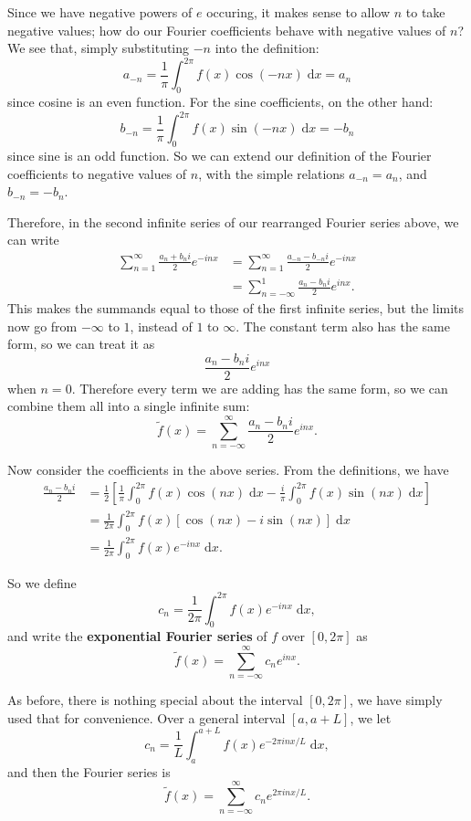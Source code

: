 \documentclass{article}
\newcommand{\diff}{\;\mathrm{d}}
\begin{document}
Since we have negative powers of $e$ occuring, it makes sense to allow $n$ to take negative values; how do our Fourier coefficients behave with negative values of $n$? We see that, simply substituting $-n$ into the definition:
\[a_{-n} = \frac{1}{\pi}\int_0^{2\pi} f(x)\cos\left(-nx\right)\diff x=a_n\]
since cosine is an even function. For the sine coefficients, on the other hand:
\[b_{-n} = \frac{1}{\pi}\int_0^{2\pi} f(x)\sin\left(-nx\right)\diff x=-b_n\]
since sine is an odd function. So we can extend our definition of the Fourier coefficients to negative values of $n$, with the simple relations $a_{-n}=a_n$, and $b_{-n}=-b_n$.

Therefore, in the second infinite series of our rearranged Fourier series above, we can write
\begin{align*}
	\sum_{n=1}^\infty \frac{a_n+b_ni}{2}e^{-inx}&=\sum_{n=1}^\infty \frac{a_{-n}-b_{-n}i}{2}e^{-inx}\\
	&= \sum_{n=-\infty}^1 \frac{a_n-b_ni}{2}e^{inx}.
\end{align*}
This makes the summands equal to those of the first infinite series, but the limits now go from $-\infty$ to $1$, instead of $1$ to $\infty$. The constant term also has the same form, so we can treat it as
\[\frac{a_n-b_ni}{2}e^{inx}\]
when $n=0$. Therefore every term we are adding has the same form, so we can combine them all into a single infinite sum:
\[\tilde{f}(x)=\sum_{n=-\infty}^\infty \frac{a_n-b_ni}{2}e^{inx}.\]\medskip


Now consider the coefficients in the above series. From the definitions, we have
\begin{align*}
	\frac{a_n-b_ni}{2} &= \frac{1}{2}\left[\frac{1}{\pi}\int_0^{2\pi}\!\!f(x)\cos\left(nx\right)\diff x -\frac{i}{\pi}\int_0^{2\pi}\!\! f(x)\sin\left(nx\right)\diff x\right]\\
	&=\frac{1}{2\pi}\int_0^{2\pi}\!\!f(x)\left[\cos\left(nx\right) - i \sin\left(nx\right)\right]\diff x\\
	&=\frac{1}{2\pi}\int_0^{2\pi}\!\! f(x)e^{-inx}\diff x.
\end{align*}

So we define
\[c_n=\frac{1}{2\pi}\int_0^{2\pi}\!\!f(x)e^{-inx}\diff x,\]
and write the \textbf{exponential Fourier series} of $f$ over $[0,2\pi]$ as
\[\tilde{f}(x)=\sum_{n=-\infty}^\infty c_n e^{inx}.\]\bigskip

As before, there is nothing special about the interval $[0,2\pi]$, we have simply used that for convenience. Over a general interval $[a,a+L]$, we let
\[c_n=\frac{1}{L}\int_a^{a+L}\!\!\!f(x)e^{-2\pi i nx/L}\diff x,\]
and then the Fourier series is
\[\tilde{f}(x) = \sum_{n=-\infty}^\infty c_ne^{2\pi inx/L}.\]
\end{document}
